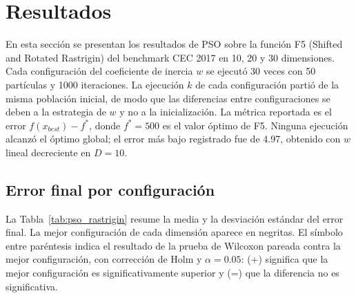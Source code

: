 \section{Resultados}
\label{sec:resultados}

En esta sección se presentan los resultados de PSO sobre la función F5 (Shifted and Rotated Rastrigin) del benchmark CEC 2017 en 10, 20 y 30 dimensiones. Cada configuración del coeficiente de inercia $w$ se ejecutó 30 veces con 50 partículas y 1000 iteraciones. La ejecución $k$ de cada configuración partió de la misma población inicial, de modo que las diferencias entre configuraciones se deben a la estrategia de $w$ y no a la inicialización. La métrica reportada es el error $f(x_{best}) - f^*$, donde $f^* = 500$ es el valor óptimo de F5. Ninguna ejecución alcanzó el óptimo global; el error más bajo registrado fue de 4.97, obtenido con $w$ lineal decreciente en $D=10$.

\subsection{Error final por configuración}

La Tabla~\ref{tab:pso_rastrigin} resume la media y la desviación estándar del error final. La mejor configuración de cada dimensión aparece en negritas. El símbolo entre paréntesis indica el resultado de la prueba de Wilcoxon pareada contra la mejor configuración, con corrección de Holm y $\alpha = 0.05$: (+) significa que la mejor configuración es significativamente superior y (=) que la diferencia no es significativa.

\begin{table}[H]
\centering
\caption{Error $f(x_{best})-f^*$ de PSO en F5 (Rastrigin) (media $\pm$ desviación estándar, 30 ejecuciones).}
\label{tab:pso_rastrigin}
\end{table}

